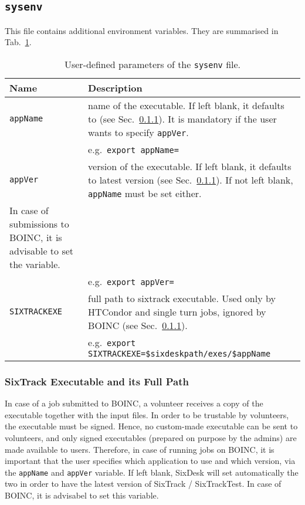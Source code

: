 \subsection{\texttt{sysenv}}\label{Sec:InputFiles:sysenv}
This file contains additional environment variables.
They are summarised in Tab.~\ref{tab:sysenv}.
\begin{table}[h]
\begin{center}
    \caption{User-defined parameters of the \texttt{sysenv} file.}
    \label{tab:sysenv}
    \begin{tabular}{|p{3cm}|p{12cm}|}
    \hline
    \rowcolor{blue!30}
    \textbf{Name} & \textbf{Description} \\
    \hline
    \texttt{appName} & name of the executable.
    If left blank, it defaults to \texttt{\whichSixTrackVersion{}} (see Sec.~\ref{Sec:SixTrackExes}).
    It is mandatory if the user wants to specify \texttt{appVer}. \\
    & e.g.~\texttt{export appName=\whichSixTrack{}} \\
    \hline
    \texttt{appVer} & version of the executable.
    If left blank, it defaults to latest version (see Sec.~\ref{Sec:SixTrackExes}).
    If not left blank, \texttt{appName} must be set either. \\
    In case of submissions to BOINC, it is advisable to set the variable. \\
    & e.g.~\texttt{export appVer=\whichSixTrackVersion{}} \\
    \hline
    \texttt{SIXTRACKEXE} & full path to sixtrack executable.
    Used only by HTCondor and single turn jobs, ignored by BOINC
    (see Sec.~\ref{Sec:SixTrackExes}). \\
    & e.g.~\texttt{export SIXTRACKEXE=\$sixdeskpath/exes/\$appName} \\
    \hline
    \end{tabular}
\end{center}
\end{table}

\subsubsection{SixTrack Executable and its Full Path}\label{Sec:SixTrackExes}
In case of a job submitted to BOINC, a volunteer receives
a copy of the executable together with the input files. In order to
be trustable by volunteers, the executable must be signed.
Hence, no custom-made executable can be sent to volunteers, and
only signed executables (prepared on purpose by the admins)
are made available to users.
Therefore, in case of running jobs on BOINC, it is important
that the user specifies which application to use and which version,
via the \texttt{appName} and \texttt{appVer} variable. If left
blank, SixDesk will set automatically the two in order to have
the latest version of SixTrack / SixTrackTest.
In case of BOINC, it is advisabel to set this variable.


